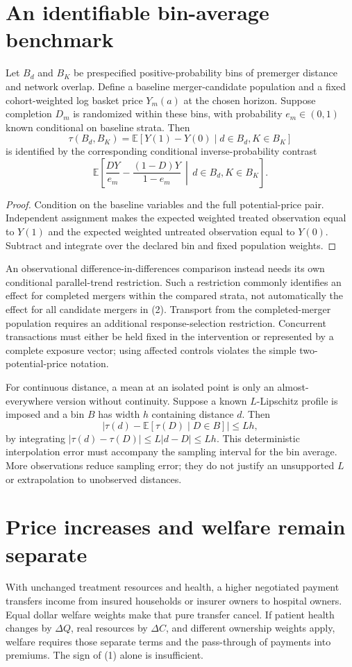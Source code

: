 \documentclass[11pt,a4paper]{article}
\newcommand{\E}{\mathbb E}
\begin{document}
\section{An identifiable bin-average benchmark}
Let $B_d$ and $B_K$ be prespecified positive-probability bins of premerger distance and network overlap. Define a baseline merger-candidate population and a fixed cohort-weighted log basket price $Y_m(a)$ at the chosen horizon. Suppose completion $D_m$ is randomized within these bins, with probability $e_m\in(0,1)$ known conditional on baseline strata. Then
\[
 \tau(B_d,B_K)=\E[Y(1)-Y(0)\mid d\in B_d,K\in B_K]
\]
is identified by the corresponding conditional inverse-probability contrast
\[
 \E\left[\frac{DY}{e_m}-\frac{(1-D)Y}{1-e_m}
       \,\middle|\,d\in B_d,K\in B_K\right]. \tag{2}
\]
\begin{proof}
Condition on the baseline variables and the full potential-price pair. Independent assignment makes the expected weighted treated observation equal to $Y(1)$ and the expected weighted untreated observation equal to $Y(0)$. Subtract and integrate over the declared bin and fixed population weights.
\end{proof}

An observational difference-in-differences comparison instead needs its own conditional parallel-trend restriction. Such a restriction commonly identifies an effect for completed mergers within the compared strata, not automatically the effect for all candidate mergers in (2). Transport from the completed-merger population requires an additional response-selection restriction. Concurrent transactions must either be held fixed in the intervention or represented by a complete exposure vector; using affected controls violates the simple two-potential-price notation.

For continuous distance, a mean at an isolated point is only an almost-everywhere version without continuity. Suppose a known $L$-Lipschitz profile is imposed and a bin $B$ has width $h$ containing distance $d$. Then
\[
 |\tau(d)-\E[\tau(D)\mid D\in B]|\le Lh,
\]
by integrating $|\tau(d)-\tau(D)|\le L|d-D|\le Lh$. This deterministic interpolation error must accompany the sampling interval for the bin average. More observations reduce sampling error; they do not justify an unsupported $L$ or extrapolation to unobserved distances.

\section{Price increases and welfare remain separate}
With unchanged treatment resources and health, a higher negotiated payment transfers income from insured households or insurer owners to hospital owners. Equal dollar welfare weights make that pure transfer cancel. If patient health changes by $\Delta Q$, real resources by $\Delta C$, and different ownership weights apply, welfare requires those separate terms and the pass-through of payments into premiums. The sign of (1) alone is insufficient.
\end{document}
